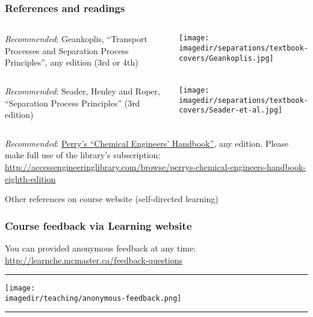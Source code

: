 \begin{frame}\frametitle{References and readings}
	\vspace{12pt}
	\begin{columns}[t]
			\emph{Recommended}: Geankoplis, ``Transport Processes and Separation Process Principles'', any edition (3rd or 4th)
			\vspace{-1cm}
			\begin{center}
				\texttt{[image: \\imagedir/separations/textbook-covers/Geankoplis.jpg]}
			\end{center}
	\end{columns}
	
	\vspace{12pt}
	\begin{columns}[t]
			\emph{Recommended}: Seader, Henley and Roper, ``Separation Process Principles'' (3rd edition)
			\vspace{-1cm}
			\begin{center}
				\texttt{[image: \\imagedir/separations/textbook-covers/Seader-et-al.jpg]}
			\end{center}
	\end{columns}
	\vspace{12pt}	
	\emph{Recommended}: \href{http://accessengineeringlibrary.com/browse/perrys-chemical-engineers-handbook-eighth-edition}{Perry's ``Chemical Engineers' Handbook''}, any edition. Please make full use of the library's subscription: \\
	\href{http://accessengineeringlibrary.com/browse/perrys-chemical-engineers-handbook-eighth-edition}{\tiny http://accessengineeringlibrary.com/browse/perrys-chemical-engineers-handbook-eighth-edition}
	
	\vspace{24pt}
	Other references on course website (self-directed learning)
	
\end{frame}

\begin{frame}\frametitle{Course feedback via Learning website}
	You can provided anonymous feedback at any time:
	\href{http://learnche.mcmaster.ca/feedback-questions}{http://learnche.mcmaster.ca/feedback-questions}
	\vspace{12pt}
	\hrule
	\begin{center}
		\texttt{[image: \\imagedir/teaching/anonymous-feedback.png]}
	\end{center}
	\hrule
\end{frame}

